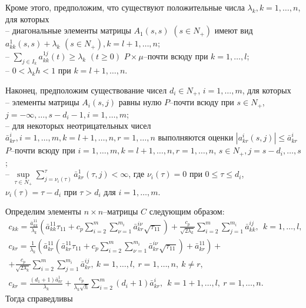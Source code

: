 Кроме этого, предположим, что существуют положительные числа
$\lambda _k, k = 1, \dots, n$, для которых\\
\noindent
-- диагональные
элементы матрицы $ A_1(s,s)$ $(s \in N_+)$ имеют вид
$a_{kk}^{1}(s,s) + \lambda _k \,\, (s \in N_+), k=l + 1, \dots, n$;\\
-- $\sum \limits_{j\in I_k}a^{1j}_{kk}(t)  \geq \lambda _k
\,\, (t\geq 0)$ $P\times\mu$--почти всюду при $k = 1,\dots,l$;\\
-- $0 < \lambda _kh < 1$
при $ k = l + 1, \dots, n$.

Наконец, предположим существование чисел $d_i \in N_+$, $i =
1,\dots,m$, для которых\\
\noindent
 --
 элементы матрицы $A_i(s,j)$ равны нулю
$P$--почти всюду при $s \in N_+$, $j=-\infty,\dots,s-d_i-1,
i=1,\dots,m$;\\
-- для некоторых неотрицательных чисел $\bar
a^i_{kr},i=1,\dots,m, k = l+1, \dots, n, r = 1,\dots,n$ выполняются оценки
$|a^i_{kr}(s,j)| \leq \bar a^i_{kr}$ $P$--почти всюду при
$i=1,\dots,m, k = l+1, \dots, n, r = 1,\dots,n$, $s \in N_+, j = s - d_i,
\dots, s$;\\
--  $\mathrel {\mathop {\sup} \limits _{\tau \in N_+}}\sum
\limits _{j=\nu _i (\tau)}^{\tau}\bar a^{1}_{kr}(\tau,j) < \infty $,
где $\nu _i (\tau) = 0$ при $0 \le \tau \le d_i$, $\nu _i (\tau) =
\tau - d_i$ при $\tau > d_i$ для  $i= 1,\dots,m$.

Определим элементы $n\times n$--матрицы $C$ следующим образом:
$$
\begin{array}{crl}
c_{kk}  = \frac{\bar a^{11}_{kk}}{\lambda _k }\left(\bar
a^{11}_{kk}\tau _{11}  + c_p\sum \limits_{i=2}^m \sum
\limits_{\nu=1}^{m_i}\bar a^{i\nu}_{kr}\sqrt{\tau _{11}}\right) +
\frac{c_p}{\sqrt{2\lambda_k }}\sum
\limits_{i=2}^m \sum \limits_{j=1}^{m_i}\bar a^{ij}_{kk}, \ \ k = 1,\dots,l,\\
c_{kr} = \frac{1}{\lambda _k }\left(\bar a^{11}_{kr}\left(\bar
a^{11}_{kr} \tau _{11} + c_p\sum \limits_{i=2}^m \sum
\limits_{\nu=1}^{m_i}\bar a^{i\nu}_{kr}\sqrt{\tau _{11}}\right)
+ \bar a^{11}_{kr}\right)+
\\ +
\frac{c_p}{\sqrt{2\lambda_k }}\sum
\limits_{i=2}^m \sum \limits_{j=1}^{m_i}\bar a^{ij}_{kr}, \ k =
1,\dots,l,\ r = 1,\dots, n, \ k \neq r,\\
 c_{kr} = \frac{(d_1+1)\bar a^{1}_{kr}}{\lambda_k} +
\frac{c_p}{\lambda_k\sqrt{h}} \sum \limits _{i=2}^{m}\mathrel (d_i +
1)\bar a^{i}_{kr}, \ \ k = 1 + 1,\dots,l,\ r = 1,\dots,n.
\end{array}
$$
Тогда справедливы

